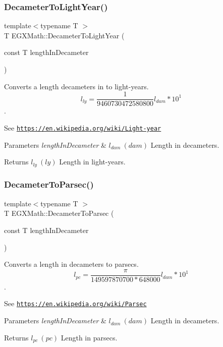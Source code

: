 \subsubsection{\texorpdfstring{Decameter\+To\+Light\+Year()}{DecameterToLightYear()}}
{\footnotesize\ttfamily template$<$typename T $>$ \\
T E\+G\+X\+Math\+::\+Decameter\+To\+Light\+Year (\begin{DoxyParamCaption}\item[{const T}]{length\+In\+Decameter }\end{DoxyParamCaption})}



Converts a length decameters in to light-\/years. \[ l_{ly}= \frac{1}{9460730472580800} l_{dam} * 10^{1} \]. 

See \href{https://en.wikipedia.org/wiki/Light-year}{\tt https\+://en.\+wikipedia.\+org/wiki/\+Light-\/year} 
\begin{DoxyParams}{Parameters}
{\em length\+In\+Decameter} & $ l_{dam}\ (dam)$ Length in decameters. \\
\hline
\end{DoxyParams}
\begin{DoxyReturn}{Returns}
$ l_{ly}\ (ly)$ Length in light-\/years. 
\end{DoxyReturn}
\mbox{\label{group___e_g_x_math-_conversions-_length_conversions-_decameter-_astronomical_ga50cf188f39f408c283b9a696ec44cee1}} 
\subsubsection{\texorpdfstring{Decameter\+To\+Parsec()}{DecameterToParsec()}}
{\footnotesize\ttfamily template$<$typename T $>$ \\
T E\+G\+X\+Math\+::\+Decameter\+To\+Parsec (\begin{DoxyParamCaption}\item[{const T}]{length\+In\+Decameter }\end{DoxyParamCaption})}



Converts a length in decameters to parsecs. \[ l_{pc}=\frac{\pi}{149597870700 * 648000} l_{dam} * 10^{1} \]. 

See \href{https://en.wikipedia.org/wiki/Parsec}{\tt https\+://en.\+wikipedia.\+org/wiki/\+Parsec} 
\begin{DoxyParams}{Parameters}
{\em length\+In\+Decameter} & $ l_{dam}\ (dam)$ Length in decameters. \\
\hline
\end{DoxyParams}
\begin{DoxyReturn}{Returns}
$ l_{pc}\ (pc)$ Length in parsecs. 
\end{DoxyReturn}
